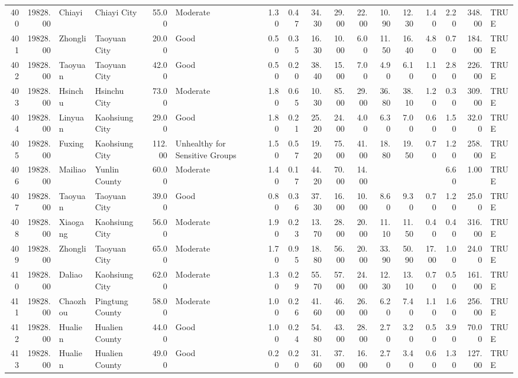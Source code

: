 \begin{table}[ht]
\begin{tabular}{rrllrlrrrrrrrrrrl}
  400 & 19828.00 & Chiayi & Chiayi City & 55.00 & Moderate & 1.30 & 0.47 & 34.30 & 29.00 & 22.00 & 10.90 & 12.30 & 1.40 & 2.20 & 348.00 & TRUE \\ 
  401 & 19828.00 & Zhongli & Taoyuan City & 20.00 & Good & 0.50 & 0.35 & 16.30 & 10.00 & 6.00 & 11.50 & 16.40 & 4.80 & 0.70 & 184.00 & TRUE \\ 
  402 & 19828.00 & Taoyuan & Taoyuan City & 42.00 & Good & 0.50 & 0.20 & 38.40 & 15.00 & 7.00 & 4.90 & 6.10 & 1.10 & 2.80 & 226.00 & TRUE \\ 
  403 & 19828.00 & Hsinchu & Hsinchu City & 73.00 & Moderate & 1.80 & 0.65 & 10.30 & 85.00 & 29.00 & 36.80 & 38.10 & 1.20 & 0.30 & 309.00 & TRUE \\ 
  404 & 19828.00 & Linyuan & Kaohsiung City & 29.00 & Good & 1.80 & 0.21 & 25.20 & 24.00 & 4.00 & 6.30 & 7.00 & 0.60 & 1.50 & 32.00 & TRUE \\ 
  405 & 19828.00 & Fuxing & Kaohsiung City & 112.00 & Unhealthy for Sensitive Groups & 1.50 & 0.57 & 19.20 & 75.00 & 41.00 & 18.80 & 19.50 & 0.70 & 1.20 & 258.00 & TRUE \\ 
  406 & 19828.00 & Mailiao & Yunlin County & 60.00 & Moderate & 1.40 & 0.17 & 44.20 & 70.00 & 14.00 &  &  &  & 6.60 & 1.00 & TRUE \\ 
  407 & 19828.00 & Taoyuan & Taoyuan City & 39.00 & Good & 0.80 & 0.36 & 37.30 & 16.00 & 10.00 & 8.60 & 9.30 & 0.70 & 1.20 & 25.00 & TRUE \\ 
  408 & 19828.00 & Xiaogang & Kaohsiung City & 56.00 & Moderate & 1.90 & 0.23 & 13.70 & 28.00 & 20.00 & 11.10 & 11.50 & 0.40 & 0.40 & 316.00 & TRUE \\ 
  409 & 19828.00 & Zhongli & Taoyuan City & 65.00 & Moderate & 1.70 & 0.95 & 18.80 & 56.00 & 20.00 & 33.90 & 50.90 & 17.00 & 1.00 & 24.00 & TRUE \\ 
  410 & 19828.00 & Daliao & Kaohsiung City & 62.00 & Moderate & 1.30 & 0.29 & 55.70 & 57.00 & 24.00 & 12.30 & 13.10 & 0.70 & 0.50 & 161.00 & TRUE \\ 
  411 & 19828.00 & Chaozhou & Pingtung County & 58.00 & Moderate & 1.00 & 0.26 & 41.60 & 46.00 & 26.00 & 6.20 & 7.40 & 1.10 & 1.60 & 256.00 & TRUE \\ 
  412 & 19828.00 & Hualien & Hualien County & 44.00 & Good & 1.00 & 0.24 & 54.80 & 43.00 & 28.00 & 2.70 & 3.20 & 0.50 & 3.90 & 70.00 & TRUE \\ 
  413 & 19828.00 & Hualien & Hualien County & 49.00 & Good & 0.20 & 0.20 & 31.60 & 37.00 & 16.00 & 2.70 & 3.40 & 0.60 & 1.30 & 127.00 & TRUE \\ 

\end{tabular}
\end{table}
